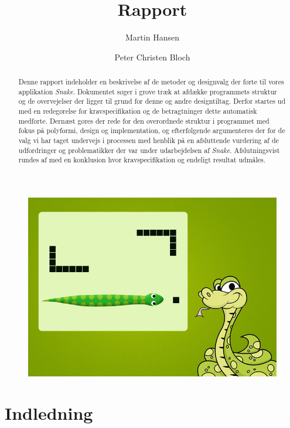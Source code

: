 \documentclass[]{article}
\title{Rapport}
\author{Martin Hansen \and Peter Christen Bloch}
\begin{document}
	
	\maketitle
	
	\begin{figure}[h!]
		\centering
		\includegraphics[width=\linewidth]{Snake_pic.jpg}
		\label{fig:diagram}
	\end{figure}
	
	\pagebreak %
	
	\begin{abstract}
		
		Denne rapport indeholder en beskrivelse af de metoder og designvalg der førte til vores applikation \textit{Snake}. Dokumentet søger i grove træk at afdække programmets struktur og de overvejelser der ligger til grund for denne og andre designtiltag. Derfor startes ud med en redegørelse for kravspecifikation og de betragtninger dette automatisk medførte. Dernæst gøres der rede for den overordnede struktur i programmet med fokus på polyformi, design og implementation, og efterfølgende argumenteres der for de valg vi har taget undervejs i processen med henblik på en afsluttende vurdering af de udfordringer og problematikker der var under udarbejdelsen af \textit{Snake}. Afslutningsvist rundes af med en konklusion hvor kravspecifikation og endeligt resultat udmåles.	
		
	\end{abstract}
	
	\pagebreak %
	\tableofcontents
	
	\pagebreak
	\section{Indledning}
	
\end{document}
